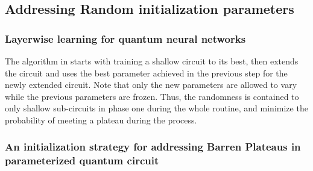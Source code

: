 \subsection{Addressing Random initialization parameters}

\subsubsection{Layerwise learning for quantum neural networks \texorpdfstring{\cite{skolikLayerwiseLearningQuantum2021}}{}}
The algorithm in \cite{skolikLayerwiseLearningQuantum2021} starts with training a shallow circuit to its best, then extends the circuit and uses the best parameter achieved in the previous step for the newly extended circuit. 
Note that only the new parameters are allowed to vary while the previous parameters are frozen.
Thus, the randomness is contained to only shallow sub-circuits in phase one during the whole routine, and minimize the probability of meeting a plateau during the process.


\subsubsection{An initialization strategy for addressing Barren Plateaus in parameterized quantum circuit \texorpdfstring{\cite{grantInitializationStrategyAddressing2019}}{}  }
